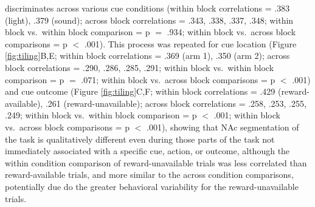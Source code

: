 \documentclass[11pt]{article}
\begin{document}
discriminates across various cue conditions (within block correlations = .383 (light), .379 (sound); across block correlations = .343, .338, .337, .348; within block vs.\ within block comparison = p $=$ .934; within block vs.\ across block comparisons = p $<$ .001). This process was repeated for cue location (Figure \ref{fig:tiling}B,E; within block correlations = .369 (arm 1), .350 (arm 2); across block correlations = .290, .286, .285, .291; within block vs.\ within block comparison = p $=$ .071; within block vs.\ across block comparisons = p $<$ .001) and cue outcome (Figure \ref{fig:tiling}C,F;  within block correlations = .429 (reward-available), .261 (reward-unavailable); across block correlations = .258, .253, .255, .249; within block vs.\ within block comparison = p $<$ .001; within block vs.\ across block comparisons = p $<$ .001), showing that NAc segmentation of the task is qualitatively
different even during those parts of the task not immediately associated with a
specific cue, action, or outcome, although the within condition comparison of
reward-unavailable trials was less correlated than reward-available trials, and
more similar to the across condition comparisons, potentially due do the greater behavioral variability for the reward-unavailable trials.
\end{document}
